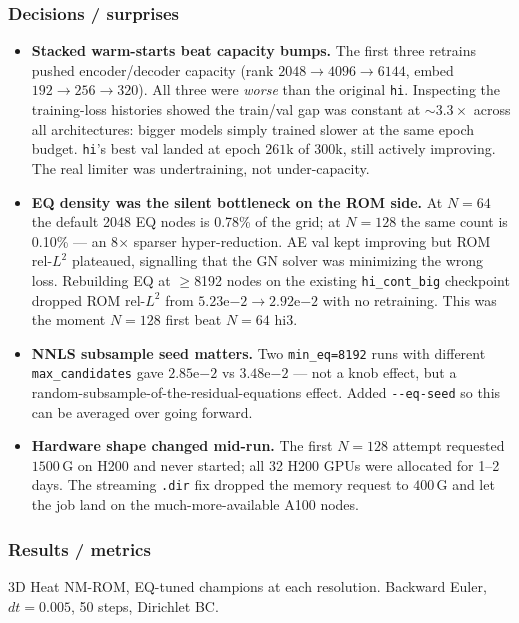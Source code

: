 \subsubsection*{Decisions / surprises}
\begin{itemize}
  \item \textbf{Stacked warm-starts beat capacity bumps.} The first three retrains pushed encoder/decoder capacity (rank $2048 \to 4096 \to 6144$, embed $192 \to 256 \to 320$). All three were \emph{worse} than the original \texttt{hi}. Inspecting the training-loss histories showed the train/val gap was constant at ${\sim}3.3\times$ across all architectures: bigger models simply trained slower at the same epoch budget. \texttt{hi}'s best val landed at epoch $261$k of $300$k, still actively improving. The real limiter was undertraining, not under-capacity.
  \item \textbf{EQ density was the silent bottleneck on the ROM side.} At $N=64$ the default 2048 EQ nodes is 0.78\% of the grid; at $N=128$ the same count is 0.10\% --- an 8$\times$ sparser hyper-reduction. AE val kept improving but ROM rel-$L^2$ plateaued, signalling that the GN solver was minimizing the wrong loss. Rebuilding EQ at $\geq$8192 nodes on the existing \texttt{hi\_cont\_big} checkpoint dropped ROM rel-$L^2$ from $5.23\mathrm{e}{-2} \to 2.92\mathrm{e}{-2}$ with no retraining. This was the moment $N=128$ first beat $N=64$ hi3.
  \item \textbf{NNLS subsample seed matters.} Two \texttt{min\_eq=8192} runs with different \texttt{max\_candidates} gave $2.85\mathrm{e}{-2}$ vs $3.48\mathrm{e}{-2}$ --- not a knob effect, but a random-subsample-of-the-residual-equations effect. Added \texttt{-{}-eq-seed} so this can be averaged over going forward.
  \item \textbf{Hardware shape changed mid-run.} The first $N=128$ attempt requested $1500$\,G on H200 and never started; all 32 H200 GPUs were allocated for 1--2 days. The streaming \texttt{.dir} fix dropped the memory request to $400$\,G and let the job land on the much-more-available A100 nodes.
\end{itemize}

\subsubsection*{Results / metrics}
3D Heat NM-ROM, EQ-tuned champions at each resolution.
Backward Euler, $dt = 0.005$, 50 steps, Dirichlet BC.

